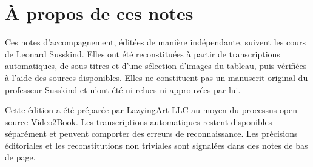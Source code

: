 \documentclass[11pt,oneside]{book}
\begin{document}
\frontmatter
\hypersetup{pageanchor=false}

\hypersetup{pageanchor=true}

\clearpage
\chapter{À propos de ces notes}
Ces notes d’accompagnement, éditées de manière indépendante, suivent les cours de Leonard Susskind. Elles ont été reconstituées à partir de transcriptions automatiques, de sous-titres et d’une sélection d’images du tableau, puis vérifiées à l’aide des sources disponibles. Elles ne constituent pas un manuscrit original du professeur Susskind et n’ont été ni relues ni approuvées par lui.

Cette édition a été préparée par \href{https://lazying.art}{LazyingArt LLC} au moyen du processus open source \href{https://github.com/lachlanchen/Video2Book}{Video2Book}. Les transcriptions automatiques restent disponibles séparément et peuvent comporter des erreurs de reconnaissance. Les précisions éditoriales et les reconstitutions non triviales sont signalées dans des notes de bas de page.
\clearpage
\tableofcontents
\mainmatter










\end{document}
